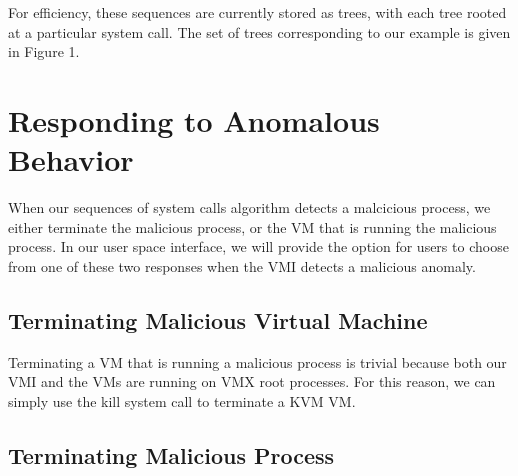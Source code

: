 \documentclass{report}
\begin{document}
\begin{spacing}{1.5}
For efficiency, these sequences are currently stored as trees, with each tree rooted at a
particular system call. The set of trees corresponding to our example is given in Figure 1.









\section{Responding to Anomalous Behavior}

When our sequences of system calls algorithm detects a malcicious process, we either terminate the malicious process, or the VM that is running the malicious process. In our user space interface, we will provide the option for users to choose from one of these two responses when the VMI detects a malicious anomaly. 


\subsection{Terminating Malicious Virtual Machine}

Terminating a VM that is running a malicious process is trivial because both our VMI and the VMs are running on VMX root processes. For this reason, we can simply use the kill system call to terminate a KVM VM. 

\subsection{Terminating Malicious Process}



\end{spacing}
\end{document}
